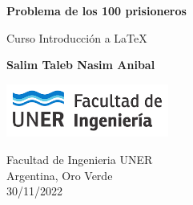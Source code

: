 \begin{titlepage}
    \begin{center}
        \vspace*{1cm}
            
        \Huge
        \textbf{Problema de los 100 prisioneros}

        \vspace{0.5cm}
        \LARGE
        Curso Introducción a LaTeX
            
        \vspace{1.5cm}
            
        \textbf{Salim Taleb Nasim Anibal}
            
        \vfill
            
        \includegraphics[width=0.4\textwidth]{imagenes/logo_fiuner.png}
            
        \Large
        Facultad de Ingenieria UNER\\
        Argentina, Oro Verde\\
        30/11/2022
            
    \end{center}
\end{titlepage}